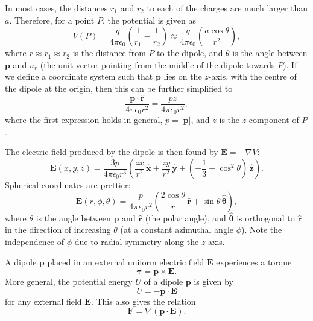 \documentclass[a4paper, 12pt]{article}
\renewcommand{\vec}[1]{\mathbf{#1}}
\newcommand{\E}{\ensuremath{\vec{E}}}
\newcommand{\e}{\ensuremath{\epsilon_0}}
\let\tmp\hat
\renewcommand{\hat}[1]{\vec{\tmp{#1}}}
\begin{document}
    In most cases, the distances $r_1$ and $r_2$ to each of the charges are much larger than $a$. 
    Therefore, for a point $P$, the potential is given as 
    \begin{equation}
        V(P) = \frac{q}{4\pi\e}\left( \frac{1}{r_1}-\frac{1}{r_2}\right) \approx 
        \frac{q}{4\pi\e}\left(\frac{a\cos\theta}{r^2}\right),
    \end{equation}
    where $r \approx r_1 \approx r_2$ is the distance from $P$ to the dipole, and $\theta$ is the angle between $\vec{p}$ and $u_r$ 
    (the unit vector pointing from the middle of the dipole towards $P$). 
    If we define a coordinate system such that $\vec{p}$ lies on the $z$-axis, 
    with the centre of the dipole at the origin, then this can be further simplified to
    \begin{equation}
        \frac{\vec{p}\cdot \hat{r}}{4\pi\e r^2} = \frac{pz}{4\pi\e r^2},
    \end{equation}
    where the first expression holds in general, $p = |\vec{p}|$, and $z$ is the $z$-component of $P$.
    
    The electric field produced by the dipole is then found by $\E = -\nabla V$:
    \begin{equation}
        \E(x, y, z) = \frac{3p}{4\pi\e r^3}\left(\frac{zx}{r^2}\,\hat{x} + 
        \frac{zy}{r^2}\,\hat{y} + \left( -\frac{1}{3} +\cos^2\theta\right)\,\hat{z}\right).
    \end{equation}
    Spherical coordinates are prettier: 
    \begin{equation}
        \E(r, \phi, \theta) = \frac{p}{4\pi\e r^2}\left(\frac{2\cos\theta}{r}\,\hat{r} + \sin\theta \, \hat{\theta}\right),
    \end{equation}
    where $\theta$ is the angle between $\vec{p}$ and $\hat{r}$ (the polar angle), 
    and $\hat{\theta}$ is orthogonal to $\hat{r}$ in the direction of increasing $\theta$ (at a constant azimuthal angle $\phi$). 
    Note the independence of $\phi$ due to radial symmetry along the $z$-axis. 
    
    A dipole $\vec{p}$ placed in an external uniform electric field $\E$ experiences a torque
    \begin{equation}
        \vec{\tau} = \vec{p} \times \E.
    \end{equation}
    More general, the potential energy $U$ of a dipole $\vec{p}$ is given by
    \begin{equation}
        U = -\vec{p}\cdot \E
    \end{equation}
    for any external field $\E$. This also gives the relation 
    \begin{equation}
        \vec{F} = \nabla\left(\vec{p}\cdot\E\right).
    \end{equation}
\end{document}
